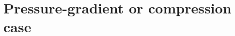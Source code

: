 \section{Pressure-gradient or compression case}
\label{sec:comparative:pressure-gradient-compression}
